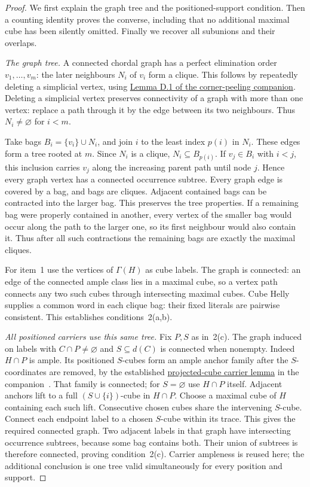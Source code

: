 \begin{proof}
We first explain the graph tree and the positioned-support condition.
Then a counting identity proves the converse, including that no additional
maximal cube has been silently omitted. Finally we recover all subunions
and their overlaps.

\emph{The graph tree.} A connected chordal graph has a perfect elimination
order $v_1,\ldots,v_m$: the later neighbours $N_i$ of $v_i$ form a clique.
This follows by repeatedly deleting a simplicial vertex, using
\href{../dismantlable-ample/sections/classification/chordal_cube_retention.tex}
{Lemma D.1 of the corner-peeling companion}.
Deleting a simplicial vertex preserves connectivity of a graph with more
than one vertex: replace a path through it by the edge between its two
neighbours. Thus $N_i\ne\varnothing$ for $i<m$.

Take bags $B_i=\{v_i\}\cup N_i$, and join $i$ to the least index $p(i)$
in $N_i$. These edges form a tree rooted at $m$. Since $N_i$ is a clique,
$N_i\subseteq B_{p(i)}$. If $v_j\in B_i$ with $i<j$, this inclusion
carries $v_j$ along the increasing parent path until node $j$.
Hence every graph vertex has a connected occurrence subtree. Every graph
edge is covered by a bag, and bags are cliques. Adjacent contained bags
can be contracted into the larger bag. This preserves the tree properties.
If a remaining bag were properly contained in another, every vertex of
the smaller bag would occur along the path to the larger one, so its first
neighbour would also contain it. Thus after all such contractions the
remaining bags are exactly the maximal cliques.

For item~1 use the vertices of $\Gamma(H)$ as cube labels.
The graph is connected: an edge of the connected ample class lies in a
maximal cube, so a vertex path connects any two such cubes through
intersecting maximal cubes. Cube Helly supplies a common word in each
clique bag: their fixed literals are pairwise consistent.
This establishes conditions~2(a,b).

\emph{All positioned carriers use this same tree.} Fix $P,S$ as in~2(c).
The graph induced on labels with $C\cap P\ne\varnothing$ and
$S\subseteq d(C)$ is connected when nonempty.
Indeed $H\cap P$ is ample. Its positioned $S$-cubes form an ample
anchor family after the $S$-coordinates are removed, by the established
\href{../dismantlable-ample/sections/classification/hall_examples.tex}
{projected-cube carrier lemma} in the companion~\cite{Damp}.
That family is connected; for $S=\varnothing$ use $H\cap P$ itself.
Adjacent anchors lift to a full $(S\cup\{i\})$-cube in $H\cap P$.
Choose a maximal cube of $H$ containing each such lift. Consecutive chosen
cubes share the intervening $S$-cube. Connect each endpoint label to a
chosen $S$-cube within its trace. This gives the required connected graph.
Two adjacent labels in that graph have intersecting occurrence subtrees,
because some bag contains both. Their union of subtrees is therefore
connected, proving condition~2(c). Carrier ampleness is reused here;
the additional conclusion is one tree valid simultaneously for every
position and support.


\end{proof}
